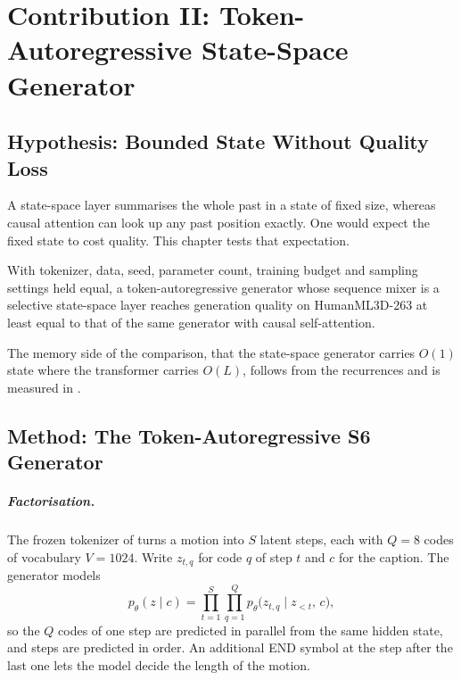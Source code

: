 \chapter{Contribution II: Token-Autoregressive State-Space Generator}
\label{chap:generator}

\section{Hypothesis: Bounded State Without Quality Loss}
\label{sec:gen_hypothesis}

A state-space layer summarises the whole past in a state of fixed size, whereas causal attention can look up any past position exactly. One would expect the fixed state to cost quality. This chapter tests that expectation.

\begin{hyp}
\label{hyp:parity}
With tokenizer, data, seed, parameter count, training budget and sampling settings held equal, a token-autoregressive generator whose sequence mixer is a selective state-space layer reaches generation quality on HumanML3D-263 at least equal to that of the same generator with causal self-attention.
\end{hyp}

The memory side of the comparison, that the state-space generator carries $O(1)$ state where the transformer carries $O(L)$, follows from the recurrences and is measured in .

\section{Method: The Token-Autoregressive S6 Generator}
\label{sec:gen_method}

\paragraph{Factorisation.} The frozen tokenizer of  turns a motion into $S$ latent steps, each with $Q = 8$ codes of vocabulary $V = 1024$. Write $z_{t,q}$ for code $q$ of step $t$ and $c$ for the caption. The generator models
\begin{equation}
p_\theta(z \mid c) = \prod_{t=1}^{S} \prod_{q=1}^{Q} p_\theta\bigl(z_{t,q} \mid z_{<t},\, c\bigr),
\label{eq:factorisation}
\end{equation}
so the $Q$ codes of one step are predicted in parallel from the same hidden state, and steps are predicted in order. An additional END symbol at the step after the last one lets the model decide the length of the motion.

